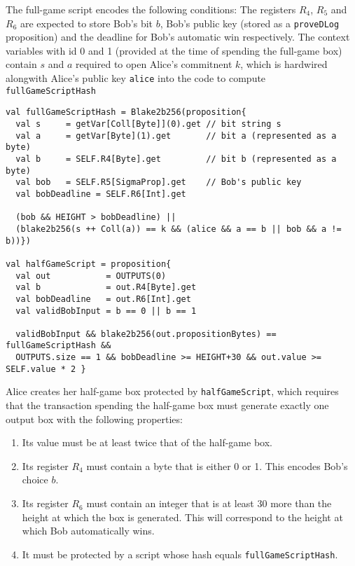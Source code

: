 \documentclass[11pt]{article}
\newcommand{\langname}{ErgoScript\xspace}
\begin{document}
The full-game script encodes the following conditions: The registers $R_4$, $R_5$ and $R_6$ are expected to store Bob's bit $b$, Bob's public key (stored as a \texttt{proveDLog} proposition) and the deadline for Bob's automatic win respectively. The context variables with id 0 and 1 (provided at the time of spending the full-game box) contain $s$ and $a$ required to open Alice's commitnent $k$, which is hardwired alongwith Alice's public key \texttt{alice} into the code to compute \texttt{fullGameScriptHash} 

\begin{verbatim}
val fullGameScriptHash = Blake2b256(proposition{
  val s     = getVar[Coll[Byte]](0).get // bit string s
  val a     = getVar[Byte](1).get       // bit a (represented as a byte)
  val b     = SELF.R4[Byte].get         // bit b (represented as a byte)
  val bob   = SELF.R5[SigmaProp].get    // Bob's public key
  val bobDeadline = SELF.R6[Int].get
   
  (bob && HEIGHT > bobDeadline) || 
  (blake2b256(s ++ Coll(a)) == k && (alice && a == b || bob && a != b))})

val halfGameScript = proposition{
  val out           = OUTPUTS(0)
  val b             = out.R4[Byte].get
  val bobDeadline   = out.R6[Int].get
  val validBobInput = b == 0 || b == 1

  validBobInput && blake2b256(out.propositionBytes) == fullGameScriptHash &&
  OUTPUTS.size == 1 && bobDeadline >= HEIGHT+30 && out.value >= SELF.value * 2 }
\end{verbatim}

Alice creates her half-game box protected by \texttt{halfGameScript}, which requires that the transaction spending the half-game box must generate exactly one output box with the following properties:

\begin{enumerate}
	\item Its value must be at least twice that of the half-game box.
	\item Its register $R_4$ must contain a byte that is either 0 or 1. This encodes Bob's choice $b$.
	\item Its register $R_6$ must contain an integer that is at least 30 more than the height at which the box is generated. This will correspond to the height at which Bob automatically wins.
	\item It must be protected by a script whose hash equals \texttt{fullGameScriptHash}.
\end{enumerate}
 
\end{document}
